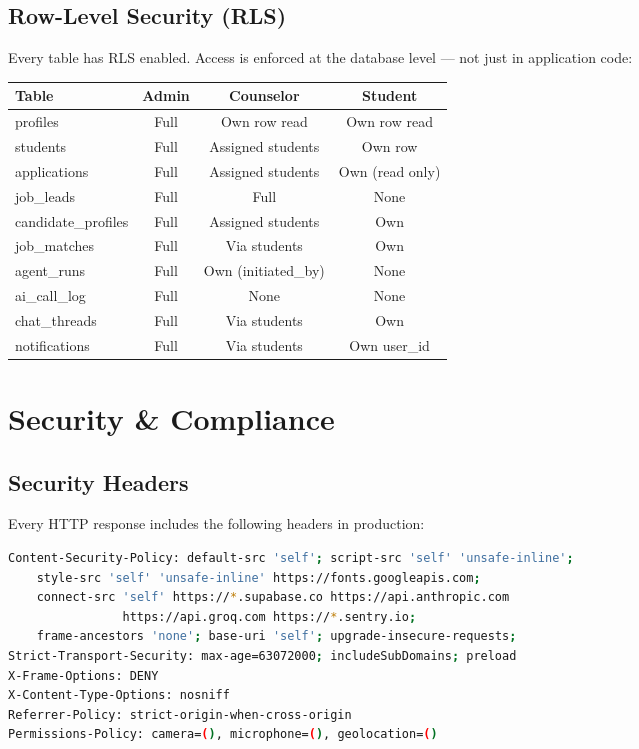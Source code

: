 \documentclass[11pt, a4paper]{article}
\begin{document}
\subsection{Row-Level Security (RLS)}

Every table has RLS enabled. Access is enforced at the database level — not just in application code:

\begin{center}
\begin{tabular}{lccc}
  \toprule
  \textbf{Table} & \textbf{Admin} & \textbf{Counselor} & \textbf{Student} \\
  \midrule
  profiles          & Full  & Own row read       & Own row read \\
  students          & Full  & Assigned students  & Own row \\
  applications      & Full  & Assigned students  & Own (read only) \\
  job\_leads        & Full  & Full               & None \\
  candidate\_profiles & Full & Assigned students & Own \\
  job\_matches      & Full  & Via students       & Own \\
  agent\_runs       & Full  & Own (initiated\_by)& None \\
  ai\_call\_log     & Full  & None               & None \\
  chat\_threads     & Full  & Via students       & Own \\
  notifications     & Full  & Via students       & Own user\_id \\
  \bottomrule
\end{tabular}
\end{center}

\section{Security \& Compliance}

\subsection{Security Headers}

Every HTTP response includes the following headers in production:

\begin{lstlisting}[language=bash]
Content-Security-Policy: default-src 'self'; script-src 'self' 'unsafe-inline';
    style-src 'self' 'unsafe-inline' https://fonts.googleapis.com;
    connect-src 'self' https://*.supabase.co https://api.anthropic.com
                https://api.groq.com https://*.sentry.io;
    frame-ancestors 'none'; base-uri 'self'; upgrade-insecure-requests;
Strict-Transport-Security: max-age=63072000; includeSubDomains; preload
X-Frame-Options: DENY
X-Content-Type-Options: nosniff
Referrer-Policy: strict-origin-when-cross-origin
Permissions-Policy: camera=(), microphone=(), geolocation=()
\end{lstlisting}
\end{document}
